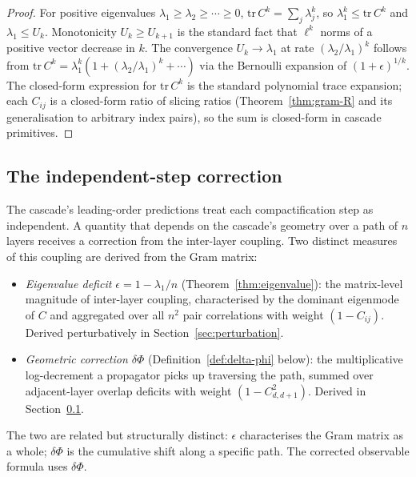 \documentclass[12pt,a4paper]{article}
\theoremstyle{remark}
\begin{document}
\begin{proof}
For positive eigenvalues $\lambda_1 \geq \lambda_2 \geq \cdots \geq 0$, $\mathrm{tr}\,C^k = \sum_j \lambda_j^k$, so $\lambda_1^k \leq \mathrm{tr}\,C^k$ and $\lambda_1 \leq U_k$. Monotonicity $U_k \geq U_{k+1}$ is the standard fact that $\ell^k$ norms of a positive vector decrease in $k$. The convergence $U_k \to \lambda_1$ at rate $(\lambda_2/\lambda_1)^k$ follows from $\mathrm{tr}\,C^k = \lambda_1^k(1 + (\lambda_2/\lambda_1)^k + \cdots)$ via the Bernoulli expansion of $(1 + \epsilon)^{1/k}$. The closed-form expression for $\mathrm{tr}\,C^k$ is the standard polynomial trace expansion; each $C_{ij}$ is a closed-form ratio of slicing ratios (Theorem~\ref{thm:gram-R} and its generalisation to arbitrary index pairs), so the sum is closed-form in cascade primitives.
\end{proof}

\subsection{The independent-step correction}\label{sec:first-order}

The cascade's leading-order predictions treat each compactification step as independent. A quantity that depends on the cascade's geometry over a path of $n$ layers receives a correction from the inter-layer coupling. Two distinct measures of this coupling are derived from the Gram matrix:

\begin{itemize}
\item \emph{Eigenvalue deficit $\epsilon = 1 - \lambda_1/n$} (Theorem~\ref{thm:eigenvalue}): the matrix-level magnitude of inter-layer coupling, characterised by the dominant eigenmode of $C$ and aggregated over all $n^2$ pair correlations with weight $(1-C_{ij})$. Derived perturbatively in Section~\ref{sec:perturbation}.
\item \emph{Geometric correction $\delta\Phi$} (Definition~\ref{def:delta-phi} below): the multiplicative log-decrement a propagator picks up traversing the path, summed over adjacent-layer overlap deficits with weight $(1-C^2_{d,d+1})$. Derived in Section~\ref{sec:first-order}.
\end{itemize}

The two are related but structurally distinct: $\epsilon$ characterises the Gram matrix as a whole; $\delta\Phi$ is the cumulative shift along a specific path. The corrected observable formula uses $\delta\Phi$.
\end{document}

